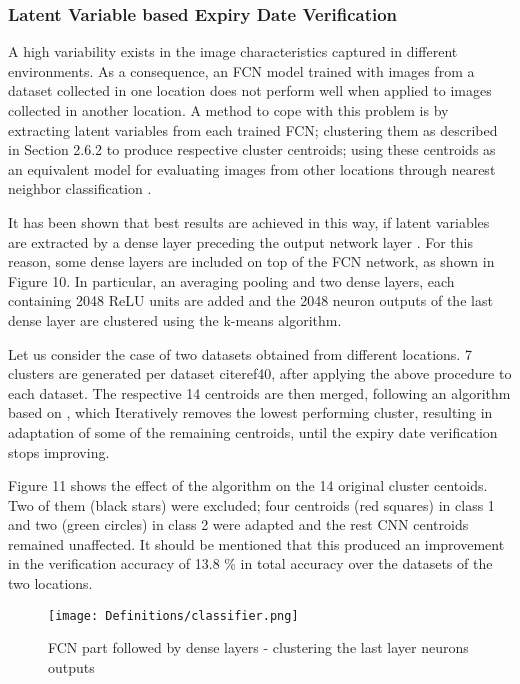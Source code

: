 \documentclass[journal,article,accept,moreauthors,pdftex]{Definitions/mdpi}
\begin{document}
\subsubsection{Latent Variable based Expiry Date Verification}

A high variability exists in the image characteristics captured in different environments. As a consequence, an FCN model trained with images from a dataset collected in one location does not perform well when applied to images collected in another location. A method to cope with this problem is by extracting latent variables from each trained FCN; clustering them as described in Section 2.6.2 to produce respective cluster centroids; using these centroids as an equivalent model for evaluating images from other locations through nearest neighbor classification \cite{ref40}. 

It has been shown that best results are achieved in this way, if latent variables are extracted by a dense layer preceding the output network layer \cite{ref2, ref41, ref42}. For this reason, some dense layers are included on top of the FCN network, as shown in Figure 10. In particular, an averaging pooling and two dense layers, each containing 2048 ReLU units are added and the 2048 neuron outputs of the last dense layer are clustered using the k-means algorithm. 

Let us consider the case of two datasets obtained from different locations. 7 clusters are generated per dataset cite{ref40}, after applying the above procedure to each dataset. The respective 14 centroids are then merged, following an algorithm based on  \cite{ref2, ref50}, which Iteratively removes the lowest performing cluster, resulting in adaptation of some of the remaining centroids, until the expiry date verification stops improving.


Figure 11 shows the effect of the algorithm on the 14 original cluster centoids. Two of them (black stars) were excluded; four centroids (red squares) in class 1 and two (green circles) in class 2 were adapted and the rest CNN centroids remained unaffected. It should be mentioned that this produced an improvement in the verification accuracy of 13.8 \% in total accuracy over the datasets of the two locations.

\begin{figure*}[tph!]
\texttt{[image: Definitions/classifier.png]}
\centering
\caption{FCN part followed by dense layers - clustering the last layer neurons outputs}
\label{dataset}
\end{figure*}
\end{document}
